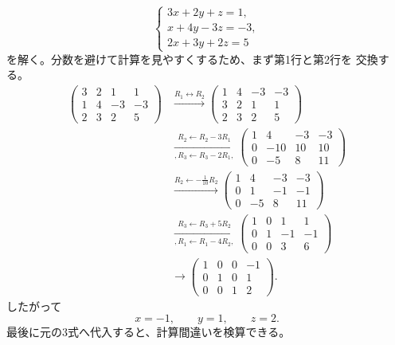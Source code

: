 \begin{example}[掃き出し法による連立方程式の解法]
\[
 \begin{cases}
  3x+2y+z=1,\\
  x+4y-3z=-3,\\
  2x+3y+2z=5
 \end{cases}
\]
を解く。分数を避けて計算を見やすくするため、まず第1行と第2行を
交換する。
\begin{align*}
 \left(\begin{array}{ccc|c}3&2&1&1\\1&4&-3&-3\\2&3&2&5\end{array}\right)
 &\xrightarrow{R_1\leftrightarrow R_2}
 \left(\begin{array}{ccc|c}1&4&-3&-3\\3&2&1&1\\2&3&2&5\end{array}\right)\\
 &\xrightarrow[,R_3\leftarrow R_3-2R_1,]{R_2\leftarrow R_2-3R_1}
 \left(\begin{array}{ccc|c}1&4&-3&-3\\0&-10&10&10\\0&-5&8&11\end{array}\right)\\
 &\xrightarrow{R_2\leftarrow-\frac1{10}R_2}
 \left(\begin{array}{ccc|c}1&4&-3&-3\\0&1&-1&-1\\0&-5&8&11\end{array}\right)\\
 &\xrightarrow[,R_1\leftarrow R_1-4R_2,]{R_3\leftarrow R_3+5R_2}
 \left(\begin{array}{ccc|c}1&0&1&1\\0&1&-1&-1\\0&0&3&6\end{array}\right)\\
 &\longrightarrow
 \left(\begin{array}{ccc|c}1&0&0&-1\\0&1&0&1\\0&0&1&2\end{array}\right).
\end{align*}
したがって
\[
 \boxed{x=-1,\qquad y=1,\qquad z=2}.
\]
最後に元の3式へ代入すると、計算間違いを検算できる。
\end{example}

